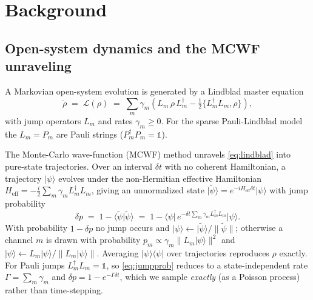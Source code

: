 \documentclass{ieeeaccess}
\newcommand{\ket}[1]{\lvert #1 \rangle}
\newcommand{\bra}[1]{\langle #1 \rvert}
\begin{document}
\section{Background}
\subsection{Open-system dynamics and the MCWF unraveling}
A Markovian open-system evolution is generated by a Lindblad master equation
\cite{lindblad1976,gks1976,breuer_petruccione,nielsen_chuang}
\begin{equation}
\dot\rho \;=\; \mathcal{L}(\rho) \;=\; \sum_m \gamma_m\!\left(
L_m\,\rho\,L_m^\dagger - \tfrac{1}{2}\{L_m^\dagger L_m,\rho\}\right),
\label{eq:lindblad}
\end{equation}
with jump operators $L_m$ and rates $\gamma_m\ge 0$. For the sparse Pauli-Lindblad model
\cite{sparse_pauli_lindblad2023} the $L_m=P_m$ are Pauli strings ($P_m^\dagger P_m=\mathbb{1}$).

The Monte-Carlo wave-function (MCWF) method \cite{dalibard1992,molmer1993,plenio1998,daley2014}
unravels \eqref{eq:lindblad} into pure-state trajectories. Over an interval $\delta t$ with no
coherent Hamiltonian, a trajectory $\ket{\psi}$ evolves under the non-Hermitian effective
Hamiltonian $H_{\mathrm{eff}}=-\tfrac{i}{2}\sum_m \gamma_m L_m^\dagger L_m$, giving an
unnormalized state $\ket{\tilde\psi}=e^{-iH_{\mathrm{eff}}\delta t}\ket{\psi}$ with jump
probability
\begin{equation}
\delta p \;=\; 1-\langle\tilde\psi|\tilde\psi\rangle
\;=\; 1-\Big\langle\psi\Big|\,e^{-\delta t\sum_m\gamma_m L_m^\dagger L_m}\Big|\psi\Big\rangle .
\label{eq:jumpprob}
\end{equation}
With probability $1-\delta p$ no jump occurs and $\ket{\psi}\!\leftarrow\!\ket{\tilde\psi}/\|\tilde\psi\|$;
otherwise a channel $m$ is drawn with probability $p_m\propto\gamma_m\|L_m\ket{\psi}\|^2$ and
$\ket{\psi}\!\leftarrow\! L_m\ket{\psi}/\|L_m\ket{\psi}\|$. Averaging
$\ket{\psi}\!\bra{\psi}$ over trajectories reproduces $\rho$ exactly. For Pauli jumps
$L_m^\dagger L_m=\mathbb{1}$, so \eqref{eq:jumpprob} reduces to a state-independent rate
$\Gamma=\sum_m\gamma_m$ and $\delta p = 1-e^{-\Gamma\delta t}$, which we sample \emph{exactly}
(as a Poisson process) rather than time-stepping.
\end{document}
